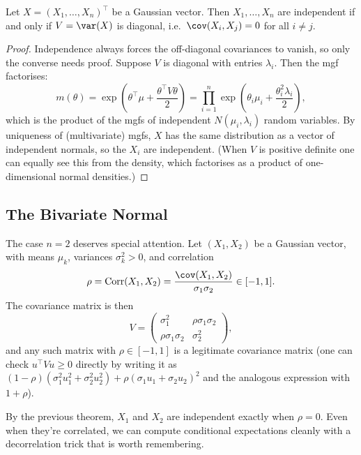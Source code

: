 \documentclass[a4paper]{scrartcl}
\newcommand{\corr}{\operatorname{Corr}}
\begin{document}
\begin{theorem}
	Let $X = (X_1, \dots, X_n)^\top$ be a Gaussian vector. Then $X_1, \dots, X_n$ are independent if and only if $V = \var(X)$ is diagonal, i.e.\ $\cov(X_i, X_j) = 0$ for all $i \neq j$.
\end{theorem}
\begin{proof}
	Independence always forces the off-diagonal covariances to vanish, so only the converse needs proof. Suppose $V$ is diagonal with entries $\lambda_i$. Then the mgf factorises:
	$$
	m(\theta) = \exp\left(\theta^\top\mu + \frac{\theta^\top V \theta}{2}\right) = \prod_{i = 1}^{n} \exp\left(\theta_i \mu_i + \frac{\theta_i^2\lambda_i}{2}\right),
	$$
	which is the product of the mgfs of independent $N(\mu_i, \lambda_i)$ random variables. By uniqueness of (multivariate) mgfs, $X$ has the same distribution as a vector of independent normals, so the $X_i$ are independent. (When $V$ is positive definite one can equally see this from the density, which factorises as a product of one-dimensional normal densities.)
\end{proof}

\subsection{The Bivariate Normal}

The case $n = 2$ deserves special attention. Let $(X_1, X_2)$ be a Gaussian vector, with means $\mu_k$, variances $\sigma_k^2 > 0$, and correlation
$$
\rho = \corr(X_1, X_2) = \frac{\cov(X_1, X_2)}{\sigma_1 \sigma_2} \in [-1, 1].
$$
The covariance matrix is then
$$
V = \begin{pmatrix}
	\sigma_1^2 & \rho\sigma_1\sigma_2 \\
	\rho\sigma_1\sigma_2 & \sigma_2^2
\end{pmatrix},
$$
and any such matrix with $\rho \in [-1, 1]$ is a legitimate covariance matrix (one can check $u^\top V u \geq 0$ directly by writing it as $(1 - \rho)(\sigma_1^2 u_1^2 + \sigma_2^2 u_2^2) + \rho(\sigma_1 u_1 + \sigma_2 u_2)^2$ and the analogous expression with $1 + \rho$).

By the previous theorem, $X_1$ and $X_2$ are independent exactly when $\rho = 0$. Even when they're correlated, we can compute conditional expectations cleanly with a decorrelation trick that is worth remembering.
\end{document}
